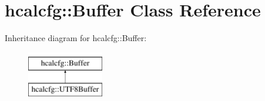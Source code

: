 \hypertarget{classhcalcfg_1_1Buffer}{\section{hcalcfg\-:\-:Buffer Class Reference}
\label{classhcalcfg_1_1Buffer}
}
Inheritance diagram for hcalcfg\-:\-:Buffer\-:\begin{figure}[H]
\begin{center}
\leavevmode
\includegraphics[height=2.000000cm]{classhcalcfg_1_1Buffer}
\end{center}
\end{figure}
